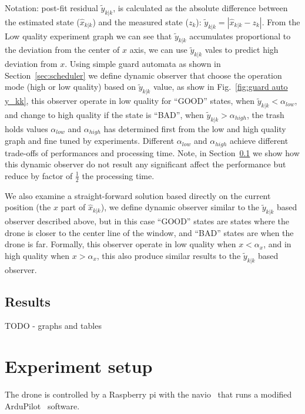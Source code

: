 \documentclass{sig-alternate-ipsn13}
\begin{document}
Notation: post-fit residual $\tilde{y}_{k|k}$, is calculated as the absolute difference between the estimated state ($\hat{x}_{k|k}$) and the measured state ($z_k$): $\tilde{y}_{k|k} = |  \hat{x}_{k|k} - z_k |$.
From the Low quality experiment graph we can see that $\tilde{y}_{k|k}$ accumulates proportional to the deviation from the center of $x$ axis, we can use $\tilde{y}_{k|k}$ vales to predict high deviation from $x$.
Using simple guard automata as shown in Section~\ref{sec:scheduler} we define dynamic observer that choose the operation mode (high or low quality) based on $\tilde{y}_{k|k}$ value, as show in Fig.~\ref{fig:guard auto y_kk}, this observer operate in low quality for ``GOOD'' states, when $\tilde{y}_{k|k} < \alpha_{low}$, and change to high quality if the state is ``BAD'', when $\tilde{y}_{k|k} > \alpha_{high}$, the trash holds values $ \alpha_{low}$ and $ \alpha_{high}$ has determined first from the low and high quality graph and fine tuned by experiments. 
Different $ \alpha_{low}$ and $ \alpha_{high}$ achieve different trade-offs of performances and processing time.
Note, in Section~\ref{sec:results} we show how this dynamic observer do not result any significant affect the performance but reduce by factor of $\frac{1}{2}$ the processing time.

We also examine a straight-forward solution based directly on the current position (the $x$ part of $\hat{x}_{k|k}$), we define dynamic observer similar to the $\tilde{y}_{k|k}$ based observer described above, but in this case ``GOOD'' states are states where the drone is closer to the center line of the window, and ``BAD'' states are when the drone is far.
Formally, this observer operate in low quality when $x < \alpha_x$, and in high quality when $x > \alpha_x$, this also produce similar results to the $\tilde{y}_{k|k}$ based observer.




\subsection{Results}
\label{sec:results}
TODO - graphs and tables

\section{Experiment setup}
\label{sec:Experiment setup}
The drone is controlled by a Raspberry pi with the navio~\cite{??? raspberry, navio} that runs a modified ArduPilot~\cite{??? APM} software.
\end{document}
